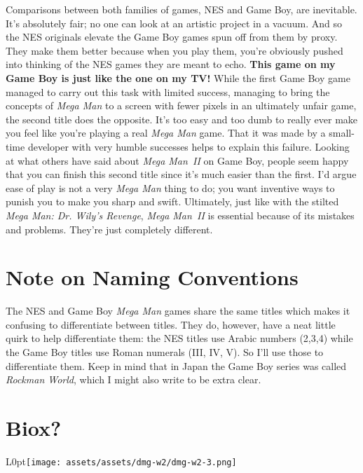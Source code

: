 \documentclass{book}
\begin{document}
Comparisons between both families of games, NES and Game Boy, are inevitable. It’s absolutely fair; no one can look at an artistic project in a vacuum. And so the NES originals elevate the Game Boy games spun off from them by proxy. They make them better because when you play them, you’re obviously pushed into thinking of the NES games they are meant to echo. \textbf{This game on my Game Boy is just like the one on my TV!} While the first Game Boy game managed to carry out this task with limited success, managing to bring the concepts of \emph{Mega Man} to a screen with fewer pixels in an ultimately unfair game, the second title does the opposite. It’s too easy and too dumb to really ever make you feel like you’re playing a real \emph{Mega Man} game. That it was made by a small-time developer with very humble successes helps to explain this failure. Looking at what others have said about \emph{Mega Man~II} on Game Boy, people seem happy that you can finish this second title since it’s much easier than the first. I’d argue ease of play is not a very \emph{Mega Man} thing to do; you want inventive ways to punish you to make you sharp and swift. Ultimately, just like with the stilted \emph{Mega Man: Dr. Wily’s Revenge}, \emph{Mega Man~II} is essential because of its mistakes and problems. They’re just completely different.\par
\FloatBarrier\section*{Note on Naming Conventions}
The NES and Game Boy \emph{Mega Man} games share the same titles which makes it confusing to differentiate between titles. They do, however, have a neat little quirk to help differentiate them: the NES titles use Arabic numbers (2,3,4) while the Game Boy titles use Roman numerals (III, IV, V). So I’ll use those to differentiate them. Keep in mind that in Japan the Game Boy series was called \emph{Rockman World}, which I might also write to be extra clear.\par
\FloatBarrier\section*{Biox?}
\begin{wrapfigure}{L}{0pt}{\texttt{[image: assets/assets/dmg-w2/dmg-w2-3.png]}}\end{wrapfigure}\noindent
\end{document}
